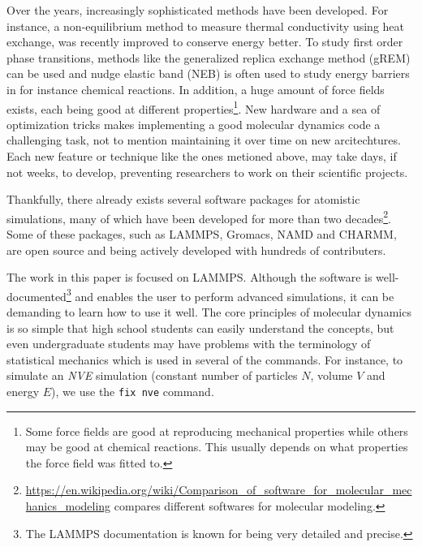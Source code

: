 \documentclass[aps,pre,twocolumn,letterpaper,floatfix,nofootinbib]{revtex4}
\newcommand{\code}[1]{\colorbox{light-gray}{\color{RawSienna}\texttt{#1}}}
\begin{document}
Over the years, increasingly sophisticated methods have been developed.
For instance, a non-equilibrium method to measure thermal conductivity using heat exchange, was recently improved\citep{wirnsberger2015enhanced} to conserve energy better.
To study first order phase transitions, methods like the generalized replica exchange method (gREM)\citep{kim2010generalized} can be used and nudge elastic band (NEB)\citep{henkelman2000climbing, henkelman2000improved} is often used to study energy barriers in for instance chemical reactions.
In addition, a huge amount of force fields exists, each being good at different properties\footnote{Some force fields are good at reproducing mechanical properties while others may be good at chemical reactions. This usually depends on what properties the force field was fitted to.}.
New hardware and a sea of optimization tricks makes implementing a good molecular dynamics code a challenging task, not to mention maintaining it over time on new arcitechtures.
Each new feature or technique like the ones metioned above, may take days, if not weeks, to develop, preventing researchers to work on their scientific projects.

Thankfully, there already exists several software packages for atomistic simulations, many of which have been developed for more than two decades\footnote{\url{https://en.wikipedia.org/wiki/Comparison_of_software_for_molecular_mechanics_modeling} compares different softwares for molecular modeling.}.
Some of these packages, such as LAMMPS\citep{Plimpton1995Fast}, Gromacs\citep{berendsen1995gromacs}, NAMD\citep{Phillips2005Scalable} and CHARMM\citep{brooks2009charmm}, are open source and being actively developed with hundreds of contributers.



The work in this paper is focused on LAMMPS.
Although the software is well-documented\footnote{The LAMMPS documentation is known for being very detailed and precise.} and enables the user to perform advanced simulations, it can be demanding to learn how to use it well.
The core principles of molecular dynamics is so simple that high school students can easily understand the concepts, but even undergraduate students may have problems with the terminology of statistical mechanics which is used in several of the commands.
For instance, to simulate an \textit{NVE} simulation (constant number of particles $N$, volume $V$ and energy $E$), we use the \code{fix nve} command.
\end{document}
